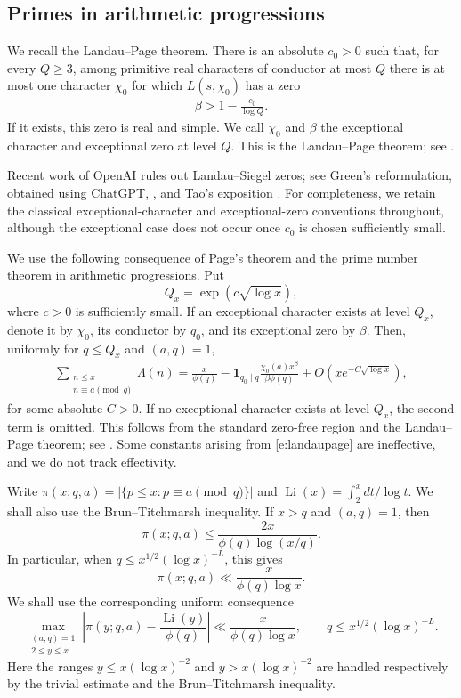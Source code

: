 \documentclass[12pt,reqno]{amsart}
\numberwithin{equation}{section}
\theoremstyle{definition}
\theoremstyle{remark}
\begin{document}
\subsection{Primes in arithmetic progressions}


We  recall the Landau--Page theorem.  There is an absolute
$c_0>0$ such that, for every $Q\geq3$, among primitive real characters
of conductor at most $Q$ there is at most one character $\chi_0$ for
which $L(s,\chi_0)$ has a zero
\begin{align}\label{e:landaupagezero}
 \beta>1-\frac{c_0}{\log Q}.
\end{align}
If it exists, this zero is real and simple.  We call $\chi_0$ and
$\beta$ the exceptional character and exceptional zero at level $Q$.
This is the Landau--Page theorem; see
\cite[Corollary~11.10]{iwaniec}.

Recent work of OpenAI rules out Landau--Siegel zeros; see
Green's reformulation, obtained using ChatGPT,
\cite{GreenSiegel2026}, and Tao's exposition
\cite{TaoSiegel2026}.
For completeness, we retain the classical exceptional-character
and exceptional-zero conventions throughout, although the
exceptional case does not occur once \(c_0\) is chosen
sufficiently small.

We use the following consequence of Page's theorem and the prime number
theorem in arithmetic progressions.  Put
\[
 Q_x=\exp(c\sqrt{\log x}),
\]
where \(c>0\) is sufficiently small.  If an exceptional character
exists at level \(Q_x\), denote it by \(\chi_0\), its conductor by
\(q_0\), and its exceptional zero by \(\beta\).  Then, uniformly for
\(q\leq Q_x\) and \((a,q)=1\),
\begin{align}\label{e:landaupage}
 \sum_{\substack{n\leq x\\n\equiv a\pmod q}}\Lambda(n)
 =
 \frac{x}{\phi(q)}
 -\mathbf1_{q_0\mid q}
 \frac{\chi_0(a)x^\beta}{\beta\phi(q)}
 +O\left(xe^{-C\sqrt{\log x}}\right),
\end{align}
for some absolute \(C>0\).  If no exceptional character exists at
level \(Q_x\), the second term is omitted. This follows from the standard
zero-free region and the Landau--Page theorem; see
\cite[Theorem~5.27]{iwaniec}.  Some constants arising from
\eqref{e:landaupage} are ineffective, and we do not track effectivity.

Write \(\pi(x;q,a)=|\{p\leq x:p\equiv a\pmod q\}|\) and
\(\operatorname{Li}(x)=\int_2^x dt/\log t\). We shall also use the Brun--Titchmarsh inequality.  If \(x>q\) and
\((a,q)=1\), then
\[
 \pi(x;q,a)
 \leq
 \frac{2x}{\phi(q)\log(x/q)}.
\]
In particular, when \(q\leq x^{1/2}(\log x)^{-L}\), this gives
\[
 \pi(x;q,a)\ll\frac{x}{\phi(q)\log x}.
\]
We shall use the corresponding uniform consequence
\[
 \max_{\substack{(a,q)=1\\2\leq y\leq x}}
 \left|
 \pi(y;q,a)-\frac{\operatorname{Li}(y)}{\phi(q)}
 \right|
 \ll
 \frac{x}{\phi(q)\log x},
 \qquad
 q\leq x^{1/2}(\log x)^{-L}.
\]
Here the ranges \(y\leq x(\log x)^{-2}\) and
\(y>x(\log x)^{-2}\) are handled respectively by the trivial estimate
and the Brun--Titchmarsh inequality.
\end{document}
